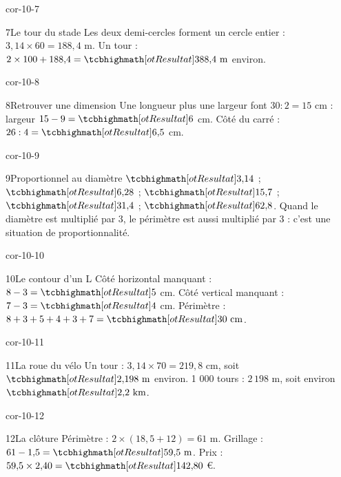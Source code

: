 \begin{blocLivre}{cor-10-7}\begin{corrige}{7}{Le tour du stade}
Les deux demi-cercles forment un cercle entier : $3{,}14\times60=188{,}4$ m. Un tour : $2\times100+188{,}4=\res{388{,}4\ \mathrm{m}}$ environ.
\label{fig-cor-10-7}
\end{corrige}\end{blocLivre}
\begin{blocLivre}{cor-10-8}\begin{corrige}{8}{Retrouver une dimension}
Une longueur plus une largeur font $30:2=15$ cm : largeur $15-9=\res6$ cm. Côté du carré : $26:4=\res{6{,}5}$ cm.
\end{corrige}\end{blocLivre}
\begin{blocLivre}{cor-10-9}\begin{corrige}{9}{Proportionnel au diamètre}
$\res{3{,}14}$ ; $\res{6{,}28}$ ; $\res{15{,}7}$ ; $\res{31{,}4}$ ; $\res{62{,}8}$. Quand le diamètre est multiplié par 3, le périmètre est aussi multiplié par 3 : c’est une situation de proportionnalité.
\end{corrige}\end{blocLivre}
\begin{blocLivre}{cor-10-10}\begin{corrige}{10}{Le contour d’un L}
Côté horizontal manquant : $8-3=\res5$ cm. Côté vertical manquant : $7-3=\res4$ cm. Périmètre : $8+3+5+4+3+7=\res{30\ \mathrm{cm}}$.
\label{fig-cor-10-10}
\end{corrige}\end{blocLivre}
\begin{blocLivre}{cor-10-11}\begin{corrige}{11}{La roue du vélo}
Un tour : $3{,}14\times70=219{,}8$ cm, soit $\res{2{,}198\ \mathrm{m}}$ environ. 1 000 tours : $2\,198$ m, soit environ $\res{2{,}2\ \mathrm{km}}$.
\end{corrige}\end{blocLivre}
\begin{blocLivre}{cor-10-12}\begin{corrige}{12}{La clôture}
Périmètre : $2\times(18{,}5+12)=61$ m. Grillage : $61-1{,}5=\res{59{,}5\ \mathrm{m}}$. Prix : $59{,}5\times2{,}40=\res{142{,}80}$ €.
\end{corrige}\end{blocLivre}
